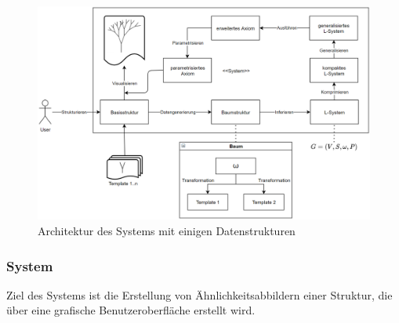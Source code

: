 \documentclass[11pt]{article}
\begin{document}
    \begin{figure}[H]
        \centering
        \includegraphics[width=14cm]{../images/System.PNG}
        \caption[Systemarchitektur]{Architektur des Systems mit einigen Datenstrukturen}
    \end{figure}

    \subsubsection{System}
    Ziel des Systems ist die Erstellung von Ähnlichkeitsabbildern einer Struktur, die über eine grafische
    Benutzeroberfläche erstellt wird.

    \newpage
\end{document}
